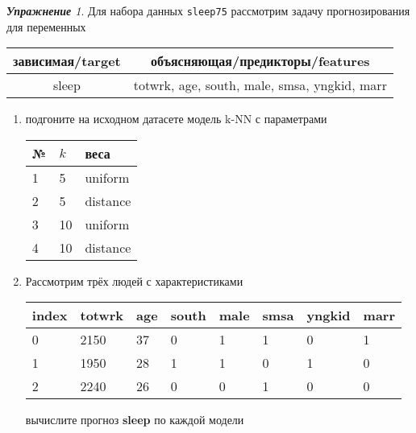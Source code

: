 \documentclass[a4,12pt]{article}
\theoremstyle{remark}
\newtheorem{exercise}{\textbf{Упражнение}}[section]
\begin{document}
\begin{exercise}
Для набора данных \texttt{sleep75} рассмотрим задачу прогнозирования
для переменных
\begin{center}
	\begin{tabular}{|c|c|}\hline
		зависимая/target & объясняющая/предикторы/features \\ \hline
		sleep & totwrk, age, south, male, smsa, yngkid, marr \\ \hline
	\end{tabular}
\end{center}
\begin{enumerate}
	\item подгоните на исходном датасете модель k-NN с параметрами
	\begin{center}
		\begin{tabular}{|l|l|l|}\hline
		№ & \(k\) & веса \\ \hline
		1 & 5 & uniform \\
		2 & 5 & distance \\
		3 & 10 & uniform \\
		4 & 10 & distance \\ \hline
		\end{tabular}
	\end{center}
	\item Рассмотрим трёх людей с характеристиками
	\begin{center}
		\begin{tabular}{|l||l|l|l|l|l|l|l|}\hline
			index & totwrk & age & south & male & smsa & yngkid & marr \\ \hline\hline
			0 & 2150 & 37 & 0 & 1 & 1 & 0 & 1 \\
			1 & 1950 & 28 & 1 & 1 & 0 & 1 & 0 \\
			2 & 2240 & 26 & 0 & 0 & 1 & 0 & 0 \\ \hline
		\end{tabular}
	\end{center}
	вычислите прогноз \textbf{sleep} по каждой модели
\end{enumerate}
\end{exercise}
\end{document}
